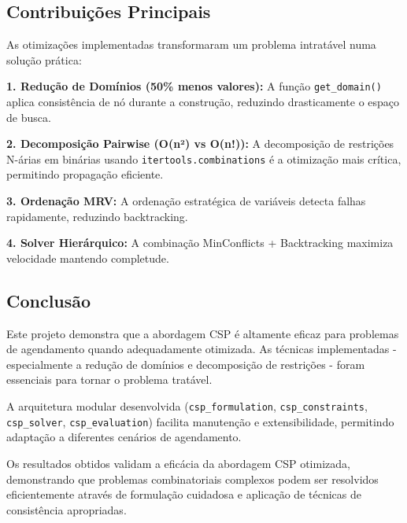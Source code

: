 \documentclass[a4paper, 12pt]{article}
\begin{document}
\subsection{Contribuições Principais}

As otimizações implementadas transformaram um problema intratável numa solução prática:

\textbf{1. Redução de Domínios (50\% menos valores):}
A função \texttt{get\_domain()} aplica consistência de nó durante a construção, reduzindo drasticamente o espaço de busca.

\textbf{2. Decomposição Pairwise (O(n²) vs O(n!)):}
A decomposição de restrições N-árias em binárias usando \texttt{itertools.combinations} é a otimização mais crítica, permitindo propagação eficiente.

\textbf{3. Ordenação MRV:}
A ordenação estratégica de variáveis detecta falhas rapidamente, reduzindo backtracking.

\textbf{4. Solver Hierárquico:}
A combinação MinConflicts + Backtracking maximiza velocidade mantendo completude.

\subsection{Conclusão}

Este projeto demonstra que a abordagem CSP é altamente eficaz para problemas de agendamento quando adequadamente otimizada. As técnicas implementadas - especialmente a redução de domínios e decomposição de restrições - foram essenciais para tornar o problema tratável.

A arquitetura modular desenvolvida (\texttt{csp\_formulation}, \texttt{csp\_constraints}, \texttt{csp\_solver}, \texttt{csp\_evaluation}) facilita manutenção e extensibilidade, permitindo adaptação a diferentes cenários de agendamento.

Os resultados obtidos validam a eficácia da abordagem CSP otimizada, demonstrando que problemas combinatoriais complexos podem ser resolvidos eficientemente através de formulação cuidadosa e aplicação de técnicas de consistência apropriadas.
\end{document}
